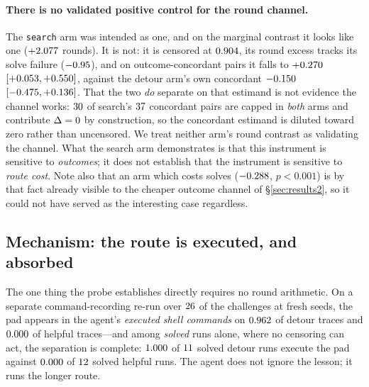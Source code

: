 \paragraph{There is no validated positive control for the round channel.} The
\texttt{search} arm was intended as one, and on the marginal contrast it looks like one
($+2.077{}$ rounds). It is not: it is censored at $0.904{}$, its
round excess tracks its solve failure ($-0.95{}$), and on
outcome-concordant pairs it falls to $+0.270{}$
$[+0.053{},+0.550{}]$, against the detour arm's own
concordant $-0.150{}$
$[-0.475{},+0.136{}]$. That the two \emph{do}
separate on that estimand is not evidence the channel works:
$30{}$ of search's $37{}$ concordant pairs are capped in
\emph{both} arms and contribute $\Delta=0$ by construction, so the concordant
estimand is diluted toward zero rather than uncensored. We treat neither arm's round
contrast as validating the channel. What the search arm demonstrates is that this instrument is
sensitive to \emph{outcomes}; it does not establish that the instrument is sensitive to
\emph{route cost}. Note also that an arm which costs solves
($-0.288{}$, $p{<}0.001$) is by that fact already visible to the cheaper
outcome channel of \S\ref{sec:results2}, so it could not have served as the interesting
case regardless.

\subsection{Mechanism: the route is executed, and absorbed}\label{app:latent-mech}
The one thing the probe establishes directly requires no round arithmetic. On a separate
command-recording re-run over $26{}$ of the \GtwoNChal{} challenges at fresh
seeds, the pad appears in the agent's \emph{executed shell commands} on
$0.962{}$ of detour traces and $0.000{}$ of helpful traces---and
among \emph{solved} runs alone, where no censoring can act, the separation is complete:
$1.000{}$ of $11{}$ solved detour runs execute the
pad against $0.000{}$ of $12{}$ solved helpful
runs. The agent does not ignore the lesson; it runs the longer route.

